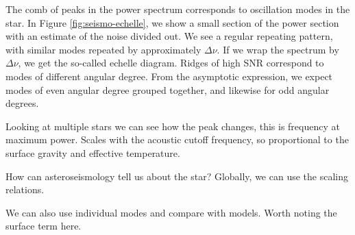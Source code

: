 The comb of peaks in the power spectrum corresponds to oscillation modes in the star. In Figure \ref{fig:seismo-echelle}, we show a small section of the power section with an estimate of the noise divided out. We see a regular repeating pattern, with similar modes repeated by approximately \(\Delta\nu\). If we wrap the spectrum by \(\Delta\nu\), we get the so-called echelle diagram. Ridges of high SNR correspond to modes of different angular degree. From the asymptotic expression, we expect modes of even angular degree grouped together, and likewise for odd angular degrees.

Looking at multiple stars we can see how the peak changes, this is frequency at maximum power. Scales with the acoustic cutoff frequency, so proportional to the surface gravity and effective temperature.

How can asteroseismology tell us about the star? Globally, we can use the scaling relations.

We can also use individual modes and compare with models. Worth noting the surface term here.
